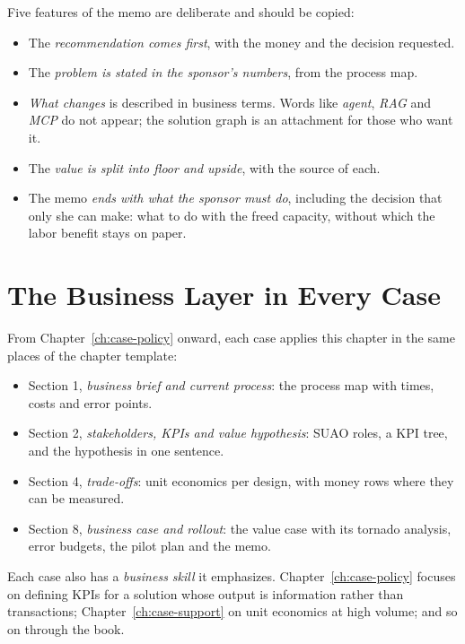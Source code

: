 Five features of the memo are deliberate and should be copied:
\begin{itemize}[itemsep=1pt]
  \item The \emph{recommendation comes first}, with the money and the decision requested.
  \item The \emph{problem is stated in the sponsor's numbers}, from the process map.
  \item \emph{What changes} is described in business terms. Words like \emph{agent}, \emph{RAG} and \emph{MCP} do not appear; the solution graph is an attachment for those who want it.
  \item The \emph{value is split into floor and upside}, with the source of each.
  \item The memo \emph{ends with what the sponsor must do}, including the decision that only she can make: what to do with the freed capacity, without which the labor benefit stays on paper.
\end{itemize}

\section{The Business Layer in Every Case}
\label{sec:business-in-cases}

From Chapter~\ref{ch:case-policy} onward, each case applies this chapter in the same places of the chapter template:
\begin{itemize}[itemsep=1pt]
  \item Section 1, \emph{business brief and current process}: the process map with times, costs and error points.
  \item Section 2, \emph{stakeholders, KPIs and value hypothesis}: SUAO roles, a KPI tree, and the hypothesis in one sentence.
  \item Section 4, \emph{trade-offs}: unit economics per design, with money rows where they can be measured.
  \item Section 8, \emph{business case and rollout}: the value case with its tornado analysis, error budgets, the pilot plan and the memo.
\end{itemize}
Each case also has a \emph{business skill} it emphasizes. Chapter~\ref{ch:case-policy} focuses on defining KPIs for a solution whose output is information rather than transactions; Chapter~\ref{ch:case-support} on unit economics at high volume; and so on through the book.

